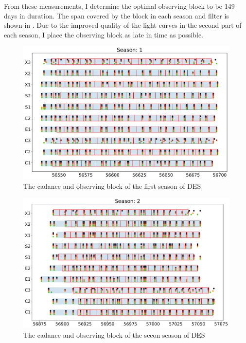 From these measurements, I determine the optimal observing block to be 149 days in duration. The span covered by the block in each season and filter is shown in . Due to the improved quality of the light curves in the second part of each season, I place the observing block as late in time as possible.

\begin{figure}[h]
  \includegraphics[width=\textwidth]{Figures/Chapter5/ObsBlock_Season1.pdf}
  \caption{The cadance and observing block of the first season of DES}
  \label{fig:ObsBlock1}
\end{figure}

\begin{figure}[h]
  \includegraphics[width=\textwidth]{Figures/Chapter5/ObsBlock_Season2.pdf}
  \caption{The cadance and observing block of the secon season of DES}
  \label{fig:ObsBlock2}
\end{figure}

